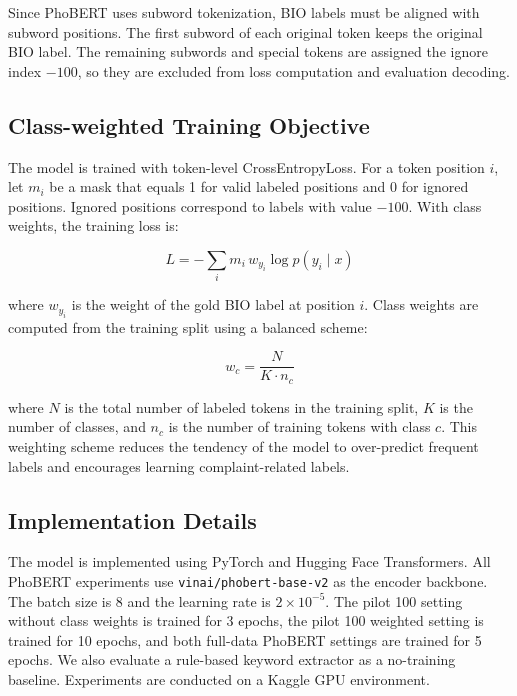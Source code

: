 \documentclass[11pt]{article}
\begin{document}
Since PhoBERT uses subword tokenization, BIO labels must be aligned with subword positions. The first subword of each original token keeps the original BIO label. The remaining subwords and special tokens are assigned the ignore index \(-100\), so they are excluded from loss computation and evaluation decoding.

\subsection{Class-weighted Training Objective}

The model is trained with token-level CrossEntropyLoss. For a token position \(i\), let \(m_i\) be a mask that equals 1 for valid labeled positions and 0 for ignored positions. Ignored positions correspond to labels with value \(-100\). With class weights, the training loss is:

\begin{equation}
L = - \sum_i m_i \, w_{y_i} \log p(y_i \mid x)
\end{equation}

where \(w_{y_i}\) is the weight of the gold BIO label at position \(i\). Class weights are computed from the training split using a balanced scheme:

\begin{equation}
w_c = \frac{N}{K \cdot n_c}
\end{equation}

where \(N\) is the total number of labeled tokens in the training split, \(K\) is the number of classes, and \(n_c\) is the number of training tokens with class \(c\). This weighting scheme reduces the tendency of the model to over-predict frequent labels and encourages learning complaint-related labels.

\subsection{Implementation Details}

The model is implemented using PyTorch and Hugging Face Transformers. All PhoBERT experiments use \texttt{vinai/phobert-base-v2} as the encoder backbone. The batch size is 8 and the learning rate is \(2 \times 10^{-5}\). The pilot 100 setting without class weights is trained for 3 epochs, the pilot 100 weighted setting is trained for 10 epochs, and both full-data PhoBERT settings are trained for 5 epochs. We also evaluate a rule-based keyword extractor as a no-training baseline. Experiments are conducted on a Kaggle GPU environment.
\end{document}
